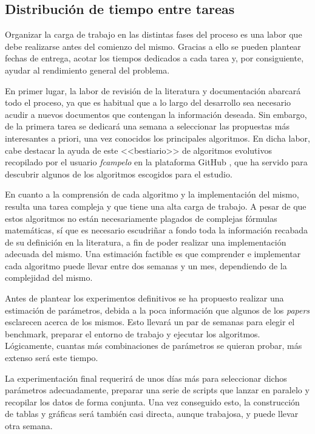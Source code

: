 \subsection{Distribución de tiempo entre tareas}

Organizar la carga de trabajo en las distintas fases del proceso es una labor que debe realizarse antes del comienzo del mismo. Gracias a ello se pueden plantear fechas de entrega, acotar los tiempos dedicados a cada tarea y, por consiguiente, ayudar al rendimiento general del problema.

En primer lugar, la labor de revisión de la literatura y documentación abarcará todo el proceso, ya que es habitual que a lo largo del desarrollo sea necesario acudir a nuevos documentos que contengan la información deseada. Sin embargo, de la primera tarea se dedicará una semana a seleccionar las propuestas más interesantes a priori, una vez conocidos los principales algoritmos. En dicha labor, cabe destacar la ayuda de este <<bestiario>> de algoritmos evolutivos recopilado por el usuario \textit{fcampelo} en la plataforma GitHub \cite{ec-bestiary-github}, que ha servido para descubrir algunos de los algoritmos escogidos para el estudio.

En cuanto a la comprensión de cada algoritmo y la implementación del mismo, resulta una tarea compleja y que tiene una alta carga de trabajo. A pesar de que estos algoritmos no están necesariamente plagados de complejas fórmulas matemáticas, sí que es necesario escudriñar a fondo toda la información recabada de su definición en la literatura, a fin de poder realizar una implementación adecuada del mismo. Una estimación factible es que comprender e implementar cada algoritmo puede llevar entre dos semanas y un mes, dependiendo de la complejidad del mismo.

Antes de plantear los experimentos definitivos se ha propuesto realizar una estimación de parámetros, debida a la poca información que algunos de los \textit{papers} esclarecen acerca de los mismos. Esto llevará un par de semanas para elegir el benchmark, preparar el entorno de trabajo y ejecutar los algoritmos. Lógicamente, cuantas más combinaciones de parámetros se quieran probar, más extenso será este tiempo.

La experimentación final requerirá de unos días más para seleccionar dichos parámetros adecuadamente, preparar una serie de scripts que lanzar en paralelo y recopilar los datos de forma conjunta. Una vez conseguido esto, la construcción de tablas y gráficas será también casi directa, aunque trabajosa, y puede llevar otra semana.

